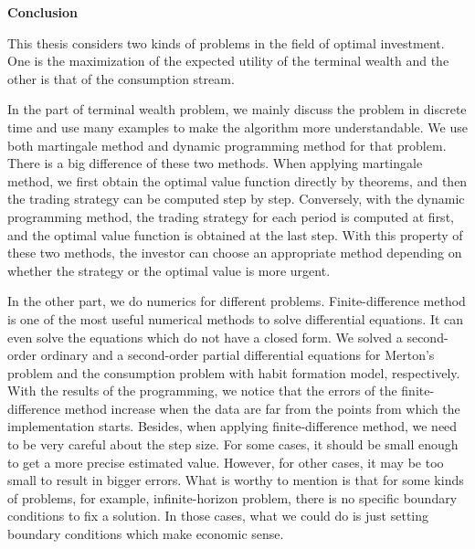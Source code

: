 \vspace{1.5cm}
\begin{center}
\Huge{{\bf Conclusion}}
\end{center}
\vspace{0.5cm}
This thesis considers two kinds of problems in the field of optimal investment. One is the maximization of the expected utility of the terminal wealth and the other is that of the consumption stream.

In the part of terminal wealth problem, we mainly discuss the problem in discrete time and use many examples to make the algorithm more understandable. We use both martingale method and dynamic programming method for that problem. There is a big difference of these two methods. When applying martingale method, we first obtain the optimal value function directly by theorems, and then the trading strategy can be computed step by step. Conversely, with the dynamic programming method, the trading strategy for each period is computed at first, and the optimal value function is obtained at the last step. With this property of these two methods, the investor can choose an appropriate method depending on whether the strategy or the optimal value is more urgent.

In the other part, we do numerics for different problems. Finite-difference method is one of the most useful numerical methods to solve differential equations. It can even solve the equations which do not have a closed form. We solved a second-order ordinary and a second-order partial differential equations for Merton's problem and the consumption problem with habit formation model, respectively. With the results of the programming, we notice that the errors of the finite-difference method increase when the data are far from the points from which the implementation starts. Besides, when applying finite-difference method, we need to be very careful about the step size. For some cases, it should be small enough to get a more precise estimated value. However, for other cases, it may be too small to result in bigger errors. What is worthy to mention is that for some kinds of problems, for example, infinite-horizon problem, there is no specific boundary conditions to fix a solution. In those cases, what we could do is just setting boundary conditions which make economic sense.




